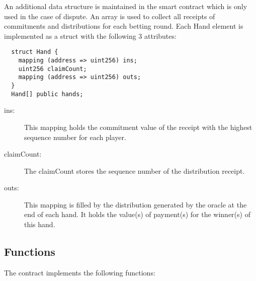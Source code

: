 An additional data structure is maintained in the smart contract which is only used in the case of dispute. An array is used to collect all receipts of commitments and distributions for each betting round. Each Hand element is implemented as a struct with the following 3 attributes:

\begin{verbatim}
  struct Hand {
    mapping (address => uint256) ins;
    uint256 claimCount;
    mapping (address => uint256) outs;
  }
  Hand[] public hands;
\end{verbatim}

\begin{description}
\item[ins:] This mapping holds the commitment value of the receipt with the highest sequence number for each player.
\item[claimCount:] The claimCount stores the sequence number of the distribution receipt. 
\item[outs:] This mapping is filled by the distribution generated by the oracle at the end of each hand. It holds the value(s) of payment(s) for the winner(s) of this hand.
\end{description}


\subsection{Functions}

The contract implements the following functions:


